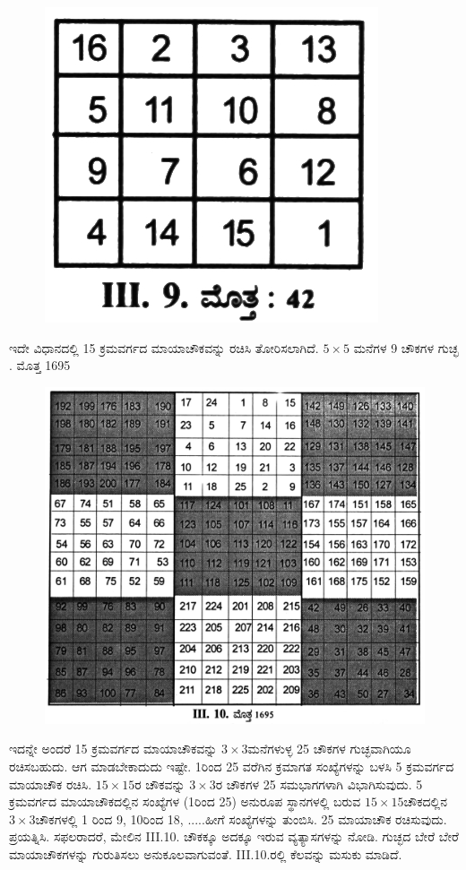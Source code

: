 \begin{itemize}
	\begin{figure}[h]
	\includegraphics{src/figures/chap3/fig3.36.jpg}
	\end{figure}

	ಇದೇ ವಿಧಾನದಲ್ಲಿ 15 ಕ್ರಮವರ್ಗದ ಮಾಯಾಚೌಕವನ್ನು ರಚಿಸಿ ತೋರಿಸಲಾಗಿದೆ. $5 \times 5$ ಮನೆಗಳ 9 ಚೌಕಗಳ ಗುಚ್ಛ . ಮೊತ್ತ 1695
	\begin{figure}[h]
	\includegraphics{src/figures/chap3/fig3.37.jpg}
	\end{figure}

	ಇದನ್ನೇ ಅಂದರೆ 15 ಕ್ರಮವರ್ಗದ ಮಾಯಾಚೌಕವನ್ನು $3 \times 3$ಮನೆಗಳುಳ್ಳ 25 ಚೌಕಗಳ ಗುಚ್ಛವಾಗಿಯೂ ರಚಿಸಬಹುದು. ಆಗ ಮಾಡಬೇಕಾದುದು ಇಷ್ಟೇ. 1ರಿಂದ 25 ವರೆಗಿನ ಕ್ರಮಾಗತ ಸಂಖ್ಯೆಗಳನ್ನು ಬಳಸಿ 5 ಕ್ರಮವರ್ಗದ ಮಾಯಾಚೌಕ ರಚಿಸಿ. $15 \times 15$ರ ಚೌಕವನ್ನು $3 \times 3$ರ ಚೌಕಗಳ 25 ಸಮಭಾಗಗಳಾಗಿ ವಿಭಾಗಿಸುವುದು. 5 ಕ್ರಮವರ್ಗದ ಮಾಯಾಚೌಕದಲ್ಲಿನ ಸಂಖ್ಯೆಗಳ (1ರಿಂದ 25) ಅನುರೂಪ ಸ್ಥಾನಗಳಲ್ಲಿ ಬರುವ $15 \times 15$ಚೌಕದಲ್ಲಿನ $3 \times 3$ಚೌಕಗಳಲ್ಲಿ 1 ರಿಂದ 9, 10ರಿಂದ 18, .....ಹೀಗೆ ಸಂಖ್ಯೆಗಳನ್ನು ತುಂಬಿಸಿ. 25 ಮಾಯಾಚೌಕ ರಚಿಸುವುದು. ಪ್ರಯತ್ನಿಸಿ. ಸಫಲರಾದರೆ, ಮೇಲಿನ  III.10. ಚೌಕಕ್ಕೂ ಅದಕ್ಕೂ ಇರುವ ವ್ಯತ್ಯಾಸಗಳನ್ನು ನೋಡಿ. ಗುಚ್ಛದ ಬೇರೆ ಬೇರೆ ಮಾಯಾಚೌಕಗಳನ್ನು ಗುರುತಿಸಲು ಅನುಕೂಲವಾಗುವಂತೆ.  III.10.ರಲ್ಲಿ ಕೆಲವನ್ನು ಮಸುಕು ಮಾಡಿದೆ.


\end{itemize}
